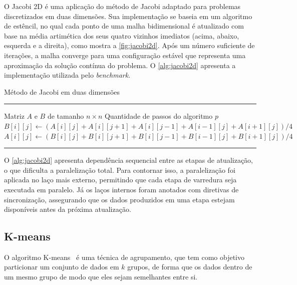 O Jacobi 2D é uma aplicação do método de Jacobi adaptado para problemas discretizados em duas dimensões. Sua implementação se baseia em um algoritmo de estêncil, no qual cada ponto de uma malha bidimensional é atualizado com base na média artimética dos seus quatro vizinhos imediatos (acima, abaixo, esquerda e a direita), como mostra a \autoref{fig:jacobi2d}. Após um número suficiente de iterações, a malha converge para uma configuração estável que representa uma aproximação da solução contínua do problema. O \autoref{alg:jacobi2d} apresenta a implementação utilizada pelo \textit{benchmark}.

\begin{algorithm}[htb]
	\caption{Método de Jacobi em duas dimensões}
	\label{alg:jacobi2d}
	\hrule
	\begin{algorithmic}[1]
		\REQUIRE Matriz $A$ e $B$ de tamanho $n \times n$
		\REQUIRE Quantidade de passos do algoritmo $p$
		\STATE $B[i][j] \gets (A[i][j] + A[i][j + 1] + A[i][j - 1] + A[i - 1][j] + A[i + 1][j]) / 4$
		\ENDFOR
		\ENDFOR
		\STATE $A[i][j] \gets (B[i][j] + B[i][j + 1] + B[i][j - 1] + B[i - 1][j] + B[i+1][j]) / 4$
		\ENDFOR
		\ENDFOR
		\ENDFOR
	\end{algorithmic}
	\hrule
	\fonte{}
\end{algorithm}

O \autoref{alg:jacobi2d} apresenta dependência sequencial entre as etapas de atualização, o que dificulta a paralelização total. Para contornar isso, a paralelização foi aplicada no laço mais externo, permitindo que cada etapa de varredura seja executada em paralelo. Já os laços internos foram anotados com diretivas de sincronização, assegurando que os dados produzidos em uma etapa estejam disponíveis antes da próxima atualização.

\subsection{K-means}\label{subsec:kmeans}

O algoritmo K-means~\cite{macqueen1967} é uma técnica de agrupamento, que tem como objetivo particionar um conjunto de dados em $k$ grupos, de forma que os dados dentro de um mesmo grupo de modo que eles sejam semelhantes entre si.

